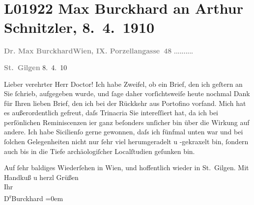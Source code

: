 

\section[Max Burckhard an Arthur Schnitzler, 8. 4. 1910]{L01922 Max Burckhard an Arthur Schnitzler, 8. 4. 1910}
\nopagebreak{}
\rehead{ }\normalsize\beginnumbering{}
\toendnotes[C]{\smallbreak\pagebreak[2]}
\pstart
           {\pb}\textcolor{gray}{\textbf{Dr. Max Burckhard}}\hfill \textcolor{gray}{\textbf{Wien, IX. Porzellangasse 48}}{ }..........\pend
           
\pstart
           \raggedleft{}\textcolor{gray}{\textbf{St. Gilgen}}{ }8. 4. 10\pend
           
\pstart{}Lieber verehrter Herr Doctor!\pend\vspace{0.5em}
\pstart
           Ich habe Zweifel, ob ein Brief, den ich geſtern an Sie ſchrieb, aufgegeben wurde, und
               ſage daher vorſichtsweiſe heute nochmal Dank für Ihren lieben Brief, den ich bei der
               Rückkehr aus Portofino vorfand. Mich hat es
               außerordentlich gefreut, daſs Trinacria Sie
               intereſſiert hat, da ich bei perſönlichen Reminiscenzen i{\geminationm}er ganz beſonders unſicher bin über die Wirkung auf andere. Ich habe Sicilienſo gerne gewonnen, daſs ich fünfmal unten war und
               bei ſolchen Gelegenheiten nicht nur ſehr viel herumgeradelt u -gekraxelt bin, ſondern
               auch bis in die Tiefe archäologiſcher Localſtudien geſunken bin.\pend
           
\pstart
           Auf ſehr baldiges Wiederſehen in Wien, und
               hoffentlich wieder in St. Gilgen. Mit Handkuß u
               herzl Grüßen{\\[\baselineskip]}Ihr{\\[\baselineskip]}\spacefill\mbox{D\textsuperscript{r}Burckhard}\pend
           \leftskip=0em{}\endnumbering{}  
      